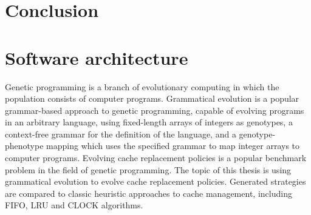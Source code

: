\documentclass[times, utf8, zavrsni, numeric]{fer}
\begin{document}






\chapter{Conclusion}






\listoffigures

\listofalgorithms

\appendix
\chapter{Software architecture}




\begin{sazetak}
Genetic programming is a branch of evolutionary computing in which the population consists of computer programs. Grammatical evolution is a popular grammar-based approach to genetic programming, capable of evolving programs in an arbitrary language, using fixed-length arrays of integers as genotypes, a context-free grammar for the definition of the language, and a genotype-phenotype mapping which uses the specified grammar to map integer arrays to computer programs. Evolving cache replacement policies is a popular benchmark problem in the field of genetic programming. The topic of this thesis is using grammatical evolution to evolve cache replacement policies. Generated strategies are compared to classic heuristic approaches to cache management, including  FIFO, LRU and CLOCK algorithms.

\end{sazetak}


\newpage
\end{document}
